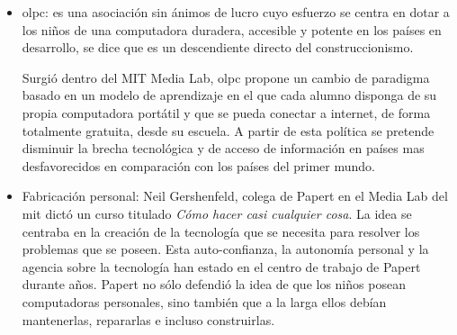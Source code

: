 \begin{itemize}


\item \Gls{olpc}: es una asociación sin ánimos de lucro cuyo esfuerzo se centra 
    en dotar a los niños de una computadora duradera, accesible y potente en los países 
    en desarrollo, se dice que es un descendiente directo del construccionismo\cite{papertian:const}.
	
	Surgió dentro del MIT Media Lab, \Gls{olpc} propone un cambio de paradigma basado 
	en un modelo de aprendizaje en el que cada alumno disponga de su propia computadora 
	portátil y que se pueda conectar a internet, de forma totalmente gratuita, desde su escuela. 
	A partir de esta política se pretende disminuir la brecha tecnológica y de acceso 
	de información en países mas desfavorecidos  en comparación con los países del primer 
	mundo\cite{videojuegos:gonzaleztardon}.
	


\item Fabricación personal: Neil Gershenfeld, colega de Papert en el Media Lab
	del \Gls{mit} dictó un curso titulado \emph{Cómo hacer casi cualquier
		cosa}. La idea se centraba en la creación de  la tecnología que
	se necesita para resolver los problemas que se poseen. Esta
	auto-confianza, la autonomía personal y la agencia sobre la tecnología
	han estado en el centro de trabajo de Papert durante años. Papert no
	sólo defendió la idea de que los niños posean computadoras personales,
	sino también que a la larga ellos debían mantenerlas, repararlas e
	incluso construirlas.


\end{itemize}
